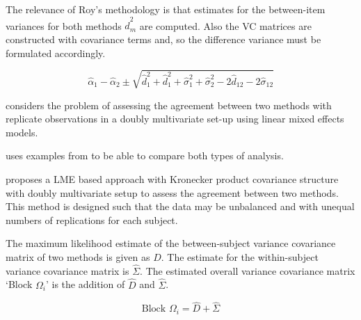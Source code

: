 \documentclass[12pt, a4paper]{report}
\theoremstyle{plain}
\theoremstyle{definition}
\theoremstyle{remark}
\begin{document}
The relevance of Roy's methodology is that estimates for the between-item variances for both methods $\hat{d}^2_m$ are computed. Also the VC matrices are constructed with covariance
terms and, so the difference variance must be formulated accordingly.


\[
\hat{\alpha}_1 - \hat{\alpha}_2 \pm \sqrt{ \hat{d}^2_1  +
	\hat{d}^2_1 + \hat{\sigma}^2_1 + \hat{\sigma}^2_2 - 2 \hat{d}_{12}
	- 2 \hat{\sigma}_12}
\]




\citet{ARoy2009} considers the problem of assessing the agreement
between two methods with replicate observations in a doubly
multivariate set-up using linear mixed effects models.

\citet{ARoy2009} uses examples from \citet{BA86} to be able to
compare both types of analysis.

\citet{ARoy2009} proposes a LME based approach with Kronecker
product covariance structure with doubly multivariate setup to
assess the agreement between two methods. This method is designed
such that the data may be unbalanced and with unequal numbers of
replications for each subject.

The maximum likelihood estimate of the between-subject variance
covariance matrix of two methods is given as $D$. The estimate for
the within-subject variance covariance matrix is $\hat{\Sigma}$.
The estimated overall variance covariance matrix `Block
$\Omega_{i}$' is the addition of $\hat{D}$ and $\hat{\Sigma}$.


\begin{equation}
	\mbox{Block  }\Omega_{i} = \hat{D} + \hat{\Sigma}
\end{equation}





\end{document}
